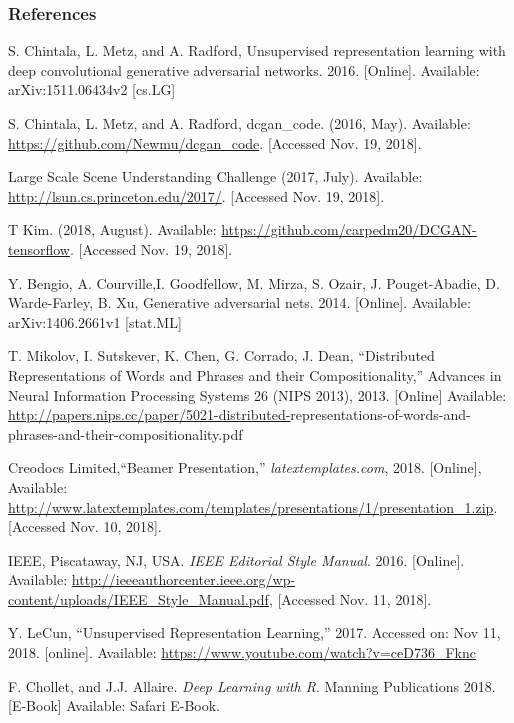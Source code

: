 \documentclass{beamer}
\begin{document}
\begin{frame}[allowframebreaks]
\frametitle{References}
\footnotesize{
\begin{thebibliography}{99} %

 S. Chintala, L. Metz, and A. Radford, 
Unsupervised representation learning with deep convolutional generative 
adversarial networks.  2016. [Online]. Available: arXiv:1511.06434v2 [cs.LG]

 S. Chintala, L. Metz, and A. Radford, dcgan\_code. (2016,
May).  Available: \url{https://github.com/Newmu/dcgan\_code}. [Accessed Nov. 19,
2018].

 Large Scale Scene Understanding Challenge (2017, July).
Available: \url{http://lsun.cs.princeton.edu/2017/}. [Accessed Nov. 19, 2018].

 T Kim. (2018, August).  Available: \url{https://github.com/carpedm20/DCGAN-tensorflow}. [Accessed Nov. 19, 2018].


 Y. Bengio, A. Courville,I. Goodfellow, M. Mirza, S. Ozair,  
J. Pouget-Abadie,  D. Warde-Farley, B. Xu, Generative adversarial nets. 2014. 
[Online]. Available: arXiv:1406.2661v1 [stat.ML]

 T. Mikolov, I. Sutskever, K. Chen, G. Corrado, J. Dean,
``Distributed Representations of Words and Phrases and their Compositionality,''
Advances in Neural Information Processing Systems 26 (NIPS 2013), 2013. 
[Online] Available: \url{http://papers.nips.cc/paper/5021-distributed-}representations-of-words-and-phrases-and-their-compositionality.pdf

 Creodocs Limited,``Beamer Presentation,''
\emph{latextemplates.com}, 2018. [Online], Available: 
\url{http://www.latextemplates.com/templates/presentations/1/presentation\_1.zip}. [Accessed Nov. 10, 2018].

 IEEE, Piscataway, NJ, USA. \emph{IEEE Editorial Style Manual}. 2016.
[Online]. Available: \url{http://ieeeauthorcenter.ieee.org/wp-content/uploads/IEEE\_Style_Manual.pdf}, [Accessed Nov. 11, 2018].

 Y. LeCun, ``Unsupervised Representation Learning,''
2017. Accessed on: Nov 11, 2018. [online]. Available: \url{https://www.youtube.com/watch?v=ceD736_Fknc}  

 F. Chollet, and J.J. Allaire.  
\textit{Deep Learning with R}. Manning Publications 2018. [E-Book] Available: Safari
E-Book.


\end{thebibliography}}
\end{frame}
\end{document}
